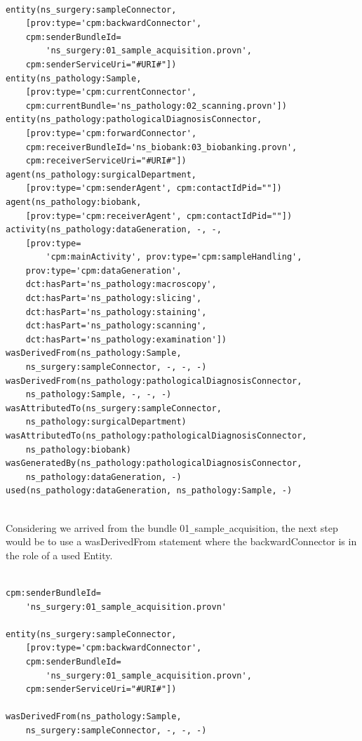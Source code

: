 \documentclass[
  digital,     %
  oneside,     %
  nosansbold,  %
  nocolorbold, %
  lof,         %
  lot,         %
]{fithesis4}
\begin{document}
\begin{verbatim}

entity(ns_surgery:sampleConnector,
    [prov:type='cpm:backwardConnector',
    cpm:senderBundleId=
        'ns_surgery:01_sample_acquisition.provn', 
    cpm:senderServiceUri="#URI#"])
entity(ns_pathology:Sample, 
    [prov:type='cpm:currentConnector',
    cpm:currentBundle='ns_pathology:02_scanning.provn'])
entity(ns_pathology:pathologicalDiagnosisConnector, 
    [prov:type='cpm:forwardConnector',
    cpm:receiverBundleId='ns_biobank:03_biobanking.provn', 
    cpm:receiverServiceUri="#URI#"])
agent(ns_pathology:surgicalDepartment, 
    [prov:type='cpm:senderAgent', cpm:contactIdPid=""])
agent(ns_pathology:biobank, 
    [prov:type='cpm:receiverAgent', cpm:contactIdPid=""])
activity(ns_pathology:dataGeneration, -, -, 
    [prov:type=
        'cpm:mainActivity', prov:type='cpm:sampleHandling',
    prov:type='cpm:dataGeneration', 
    dct:hasPart='ns_pathology:macroscopy', 
    dct:hasPart='ns_pathology:slicing',
    dct:hasPart='ns_pathology:staining', 
    dct:hasPart='ns_pathology:scanning',
    dct:hasPart='ns_pathology:examination'])
wasDerivedFrom(ns_pathology:Sample, 
    ns_surgery:sampleConnector, -, -, -)
wasDerivedFrom(ns_pathology:pathologicalDiagnosisConnector, 
    ns_pathology:Sample, -, -, -)
wasAttributedTo(ns_surgery:sampleConnector, 
    ns_pathology:surgicalDepartment)
wasAttributedTo(ns_pathology:pathologicalDiagnosisConnector, 
    ns_pathology:biobank)
wasGeneratedBy(ns_pathology:pathologicalDiagnosisConnector, 
    ns_pathology:dataGeneration, -)
used(ns_pathology:dataGeneration, ns_pathology:Sample, -)
    
\end{verbatim}

Considering we arrived from the bundle 01\verb|_|sample\verb|_|acquisition, the next step would be to use a wasDerivedFrom statement where the backwardConnector is in the role of a used Entity. 

\begin{verbatim}

cpm:senderBundleId=
    'ns_surgery:01_sample_acquisition.provn'

entity(ns_surgery:sampleConnector,
    [prov:type='cpm:backwardConnector',
    cpm:senderBundleId=
        'ns_surgery:01_sample_acquisition.provn', 
    cpm:senderServiceUri="#URI#"])

wasDerivedFrom(ns_pathology:Sample, 
    ns_surgery:sampleConnector, -, -, -)
    
\end{verbatim}
\end{document}

